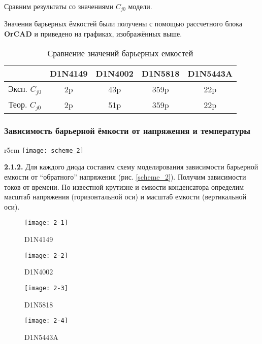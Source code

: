 \documentclass{semi}
\begin{document}
Сравним результаты со значениями $C_{j0}$ модели.

Значения барьерных ёмкостей были получены с помощью рассчетного блока \textbf{OrCAD} и приведено на графиках, изображённых выше.

\begin{table}[H]
	\centering
	\begin{tabular}{|c|c|c|c|c|}
		\hline
		&D1N4149 &D1N4002 &D1N5818 &D1N5443A \\ \hline 
		Эксп. $C_{j0}$ & 2p & 43p & 359p & 22p \\ \hline
		Теор. $C_{j0}$ & 2p & 51p & 359p & 22p \\ \hline
	\end{tabular}
	\caption{Сравнение значений барьерных емкостей}
	\label{tab_diodes}
\end{table}

\subsubsection*{Зависимость барьерной ёмкости от напряжения и температуры}

\begin{wrapfigure}{r}{5cm}
	\vspace{-0.7cm}
	\texttt{[image: scheme\_2]}
	\caption{Схема соединения}
	\label{scheme_2}
\end{wrapfigure}

\textbf{{\normalsize 2.1.2.}}
Для каждого диода составим схему моделирования зависимости барьерной емкости от “обратного” напряжения (рис. \ref{scheme_2}).
Получим зависимости токов от времени. По известной крутизне и емкости конденсатора определим масштаб напряжения (горизонтальной оси) и масштаб емкости (вертикальной оси).

\begin{figure}[H]
	\centering
	\texttt{[image: 2-1]}
	\caption{D1N4149}
\end{figure}

\begin{figure}[H]
	\centering
	\texttt{[image: 2-2]}
	\caption{D1N4002}
\end{figure}

\begin{figure}[H]
	\centering
	\texttt{[image: 2-3]}
	\caption{D1N5818}
\end{figure}

\begin{figure}[H]
	\centering
	\texttt{[image: 2-4]}
	\caption{D1N5443A}
\end{figure}
\end{document}
